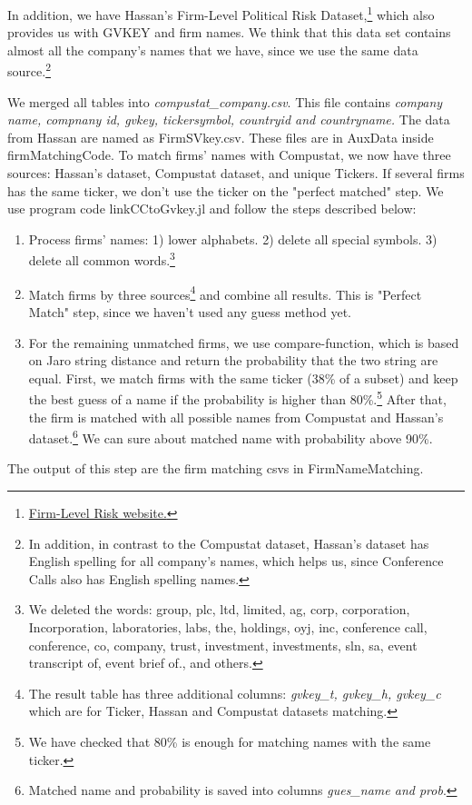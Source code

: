 \documentclass[11pt]{article}
\newcounter{file}
\begin{document}
\par In addition, we have Hassan's Firm-Level Political Risk Dataset,\footnote{\href{https://www.firmlevelrisk.com/download}{Firm-Level Risk website.}}  which also provides us with GVKEY and firm names. We think that this data set contains almost all the company's names that we have, since we use the same data source.\footnote{In addition, in contrast to the Compustat dataset, Hassan's dataset has English spelling for all company's names, which helps us, since Conference Calls also has English spelling names. }  
\par We merged all tables into \textit{compustat\_company.csv}. This file contains \textit{company name, compnany id, gvkey, tickersymbol, countryid and countryname.} The data from Hassan are named as FirmSVkey.csv. These files are in AuxData inside firmMatchingCode. To match firms' names with Compustat, we now have three sources: Hassan's dataset, Compustat dataset, and unique Tickers. If several firms has the same ticker, we don't use the ticker on the "perfect matched" step. We use program code linkCCtoGvkey.jl and follow the steps described below:
\begin{enumerate}  
	\item Process firms' names: 1) lower alphabets. 2) delete all special symbols. 3) delete all common words.\footnote{We deleted the words: group, plc, ltd, limited, ag, corp, corporation, Incorporation, laboratories, labs, the, holdings, oyj, inc, conference call, conference, co, company, trust, investment, investments, sln, sa, event transcript of, event brief of., and others.}
	\item Match firms by three sources\footnote{The result table has three additional columns: \textit{gvkey\_t, gvkey\_h, gvkey\_c} which are for Ticker, Hassan and Compustat datasets matching.} and combine all results. This is "Perfect Match" step, since we haven't used any guess method yet.
	\item For the remaining unmatched firms, we use compare-function, which is based on Jaro string distance and return the probability that the two string are equal. First, we match firms with the same ticker (38\% of a subset) and keep the best guess of a name if the probability is higher than 80\%.\footnote{We have checked that 80\% is enough for matching names with the same ticker.} After that, the firm is matched with all possible names from Compustat and Hassan's dataset.\footnote{Matched name and probability is saved into columns \textit{gues\_name and prob}.} We can sure about matched name with probability above 90\%.
\end{enumerate}
\par The output of this step are the firm matching csvs in FirmNameMatching.
\end{document}
